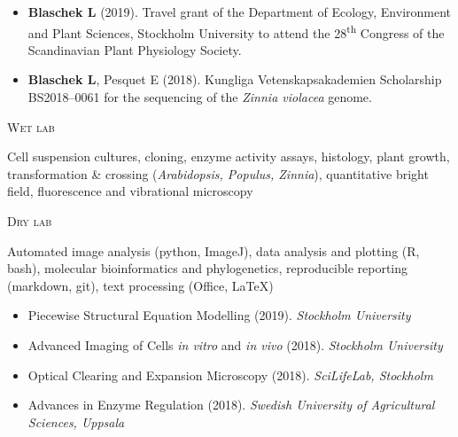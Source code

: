 \documentclass[11pt]{article}
\begin{document}
\vspace{-0.175cm}
\begin{itemize}[label={},itemindent=-9pt,leftmargin=24pt]
	\itemsep-0.1cm
	\item \textbf{Blaschek L} (2019). Travel grant of the Department of Ecology, Environment and Plant Sciences, Stockholm University to attend the 28\textsuperscript{th} Congress of the Scandinavian Plant Physiology Society.
	\item \textbf{Blaschek L}, Pesquet E (2018). Kungliga Vetenskapsakademien Scholarship BS2018--0061 for the sequencing of the \textit{Zinnia violacea} genome. 
\end{itemize}


\textsc{\large{Wet lab}} 
\begin{addmargin}[24pt]{0pt}
	Cell suspension cultures,
	cloning, 
	enzyme activity assays,  
	histology, 
	plant growth, transformation  \& crossing (\textit{Arabidopsis, Populus, Zinnia}),
	quantitative bright field, fluorescence and vibrational microscopy
\end{addmargin}
\vspace{0.2cm}

\textsc{\large{Dry lab}} 
\begin{addmargin}[24pt]{0pt}
	Automated image analysis (python, ImageJ),
	data analysis and plotting (R, bash),
	molecular bioinformatics and phylogenetics,
	reproducible reporting (markdown, git),
	text processing (Office, LaTeX)
\end{addmargin}	
\vspace{0.5cm}

\vspace{-0.175cm}
\begin{itemize}[label={},itemindent=-9pt,leftmargin=24pt]
	\itemsep-0.1cm
	\item Piecewise Structural Equation Modelling (2019). \textit{Stockholm University}
	\item Advanced Imaging of Cells \textit{in vitro} and \textit{in vivo} (2018). \textit{Stockholm University} 
	\item Optical Clearing and Expansion Microscopy (2018). \textit{SciLifeLab, Stockholm} 	
	\item Advances in Enzyme Regulation (2018). \textit{Swedish University of Agricultural Sciences, Uppsala} 
\end{itemize}
\vspace{0.3cm}
\end{document}
